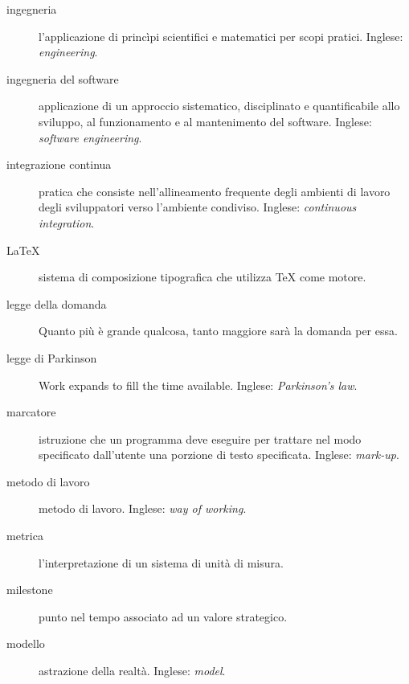 \documentclass[a4paper]{article}
\begin{document}
\begin{description}
	\item[ingegneria] 

			l'applicazione di princìpi scientifici e matematici per scopi pratici. Inglese: \emph{engineering}.
			
	\item[ingegneria del software] 

			applicazione di un approccio sistematico, disciplinato e quantificabile allo sviluppo, al funzionamento e al mantenimento del software. Inglese: \emph{software engineering}.
			
	\item[integrazione continua] 

			pratica che consiste nell'allineamento frequente degli ambienti di lavoro degli sviluppatori verso l'ambiente condiviso. Inglese: \emph{continuous integration}.
			
	\item[LaTeX] 

			sistema di composizione tipografica che utilizza TeX come motore.
			
	\item[legge della domanda] 

			Quanto più è grande qualcosa, tanto maggiore sarà la domanda per essa.
			
	\item[legge di Parkinson] 

			Work expands to fill the time available. Inglese: \emph{Parkinson's law}.
			
	\item[marcatore] 

			istruzione che un programma deve eseguire per trattare nel modo specificato dall'utente una porzione di testo specificata. Inglese: \emph{mark-up}.
			
	\item[metodo di lavoro] 

			metodo di lavoro. Inglese: \emph{way of working}.
			
	\item[metrica] 

			l'interpretazione di un sistema di unità di misura.
			
	\item[milestone] 

			punto nel tempo associato ad un valore strategico.
			
	\item[modello] 

			astrazione della realtà. Inglese: \emph{model}.
			

\end{description}
\end{document}

